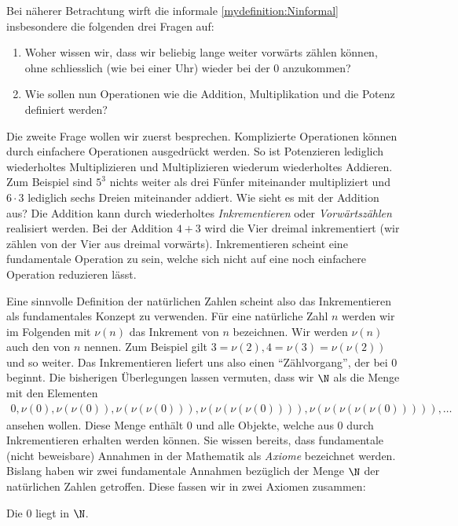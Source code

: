 Bei näherer Betrachtung wirft die informale \cref{mydefinition:Ninformal} insbesondere die folgenden drei Fragen auf:
\begin{enumerate}
	\item Woher wissen wir, dass wir beliebig lange weiter vorwärts zählen können, ohne schliesslich (wie bei einer Uhr) wieder bei der $0$ anzukommen?
	\item Wie sollen nun Operationen wie die Addition, Multiplikation und die Potenz definiert werden?
\end{enumerate}
Die zweite Frage wollen wir zuerst besprechen. Komplizierte Operationen können durch einfachere Operationen ausgedrückt werden. So ist Potenzieren lediglich wiederholtes Multiplizieren und Multiplizieren wiederum wiederholtes Addieren. Zum Beispiel sind $5^3$ nichts weiter als drei Fünfer miteinander multipliziert und $6\cdot 3$ lediglich sechs Dreien miteinander addiert. Wie sieht es mit der Addition aus? Die Addition kann durch wiederholtes \textit{Inkrementieren} oder \textit{Vorwärtszählen} realisiert werden. Bei der Addition $4+3$ wird die Vier dreimal inkrementiert (wir zählen von der Vier aus dreimal vorwärts). Inkrementieren scheint eine fundamentale Operation zu sein, welche sich nicht auf eine noch einfachere Operation reduzieren lässt.

Eine sinnvolle Definition der natürlichen Zahlen scheint also das Inkrementieren als fundamentales Konzept zu verwenden. Für eine natürliche Zahl $n$ werden wir im Folgenden mit $\nu(n)$ das Inkrement von $n$ bezeichnen. Wir werden $\nu(n)$ auch den  von $n$ nennen. Zum Beispiel gilt $3=\nu(2), 4 = \nu(3) = \nu(\nu(2))$ und so weiter. Das Inkrementieren liefert uns also einen \enquote{Zählvorgang}, der bei 0 beginnt. Die bisherigen Überlegungen lassen vermuten, dass wir $\N$ als die Menge mit den Elementen
\begin{align*}
	0, \nu(0), \nu(\nu(0)), \nu(\nu(\nu(0))), \nu(\nu(\nu(\nu(0)))), \nu(\nu(\nu(\nu(\nu(0))))), \ldots
\end{align*}
ansehen wollen. Diese Menge enthält $0$ und alle Objekte, welche aus $0$ durch Inkrementieren erhalten werden können. Sie wissen bereits, dass fundamentale (nicht beweisbare) Annahmen in der Mathematik als \textit{Axiome} bezeichnet werden. Bislang haben wir zwei fundamentale Annahmen bezüglich der Menge $\N$ der natürlichen Zahlen getroffen. Diese fassen wir in zwei Axiomen zusammen:
\begin{myaxiom}\label{myaxiom:a1}
	Die $0$ liegt in $\N$.
\end{myaxiom}

